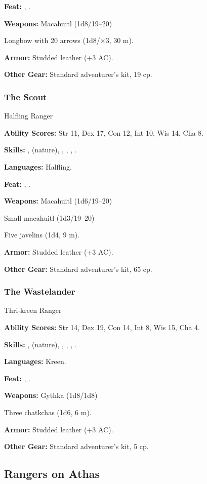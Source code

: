 \textbf{Feat:} , .

\textbf{Weapons:} Macahuitl (1d8/19--20)

Longbow with 20 arrows (1d8/$\times$3, 30 m).

\textbf{Armor:} Studded leather (+3 AC).

\textbf{Other Gear:} Standard adventurer's kit, 19 cp.

\subsubsection{The Scout}
Halfling Ranger

\textbf{Ability Scores:} Str 11, Dex 17, Con 12, Int 10, Wis 14, Cha 8.

\textbf{Skills:} ,  (nature), , , , .

\textbf{Languages:} Halfling.

\textbf{Feat:} , .

\textbf{Weapons:} Macahuitl (1d6/19--20)

Small macahuitl (1d3/19--20)

Five javelins (1d4, 9 m).

\textbf{Armor:} Studded leather (+3 AC).

\textbf{Other Gear:} Standard adventurer's kit, 65 cp.

\subsubsection{The Wastelander}
Thri-kreen Ranger

\textbf{Ability Scores:} Str 14, Dex 19, Con 14, Int 8, Wis 15, Cha 4.

\textbf{Skills:} ,  (nature), , , , .

\textbf{Languages:} Kreen.

\textbf{Feat:} , .

\textbf{Weapons:} Gythka (1d8/1d8)

Three chatkchas (1d6, 6 m).

\textbf{Armor:} Studded leather (+3 AC).

\textbf{Other Gear:} Standard adventurer's kit, 5 cp.

\subsection{Rangers on Athas}


